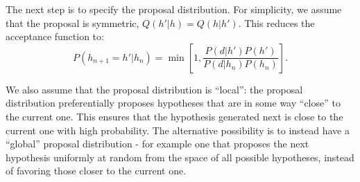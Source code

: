 
The next step is to specify the proposal distribution. For simplicity, we assume that the proposal is symmetric, $Q(h'|h) = Q(h|h')$. This reduces the acceptance function to:
\begin{equation}
\label{eq:acceptance}
P(h_{n+1}=h'|h_n) = \min\left[1, \frac{P(d|h')P(h')}{P(d|h_n) P(h_n)} \right].
\end{equation}

We also assume that the proposal distribution is ``local'': the proposal distribution preferentially proposes hypotheses that are in some way ``close'' to the current one. This ensures that the hypothesis generated next is close to the current one with high probability. The alternative possibility is to instead have a ``global'' proposal distribution - for example one that proposes the next hypothesis uniformly at random from the space of all possible hypotheses, instead of favoring those closer to the current one.

